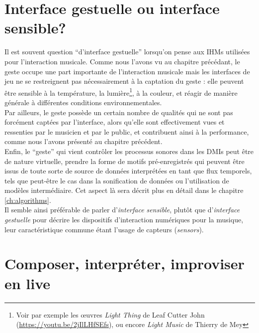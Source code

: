 \section{Interface gestuelle ou interface sensible?}

\noindent Il est souvent question ``d'interface gestuelle'' lorsqu'on pense aux \glspl{IHM} utilisées pour l'interaction musicale. Comme nous l'avons vu au chapitre précédant, le geste occupe une part importante de l'interaction musicale mais les interfaces de jeu ne se restreignent pas nécessairement à la captation du geste : elle peuvent être sensible à la température, la lumière\footnote{Voir par exemple les œuvres \textit{Light Thing} de Leaf Cutter John (\url{https://youtu.be/2jIlLHfSEfs}), ou encore \textit{Light Music} de Thierry de Mey}, à la couleur, et réagir de manière générale à différentes conditions environnementales.\\
\indent Par ailleurs, le geste possède un certain nombre de qualités qui ne sont pas forcément captées par l'interface, alors qu'elle sont effectivement vues et ressenties par le musicien et par le public, et contribuent ainsi à la performance, comme nous l'avons présenté au chapitre précédent.\\
\indent Enfin, le ``geste'' qui vient contrôler les processus sonores dans les \glspl{DMI} peut être de nature virtuelle, prendre la forme de motifs pré-enregistrés qui peuvent être issus de toute sorte de source de données interprétées en tant que flux temporels, tels que peut-être le cas dans la sonification de données ou l'utilisation de modèles intermédiaire. Cet aspect là sera décrit plus en détail dans le chapitre \ref{ch:algorithms}.\\
\indent Il semble ainsi préférable de parler d'\textit{interface sensible}, plutôt que d'\textit{interface gestuelle} pour décrire les dispositifs d'interaction numériques pour la musique, leur caractéristique commune étant l'usage de capteurs (\textit{sensors}).


\section{Composer, interpréter, improviser en live}

